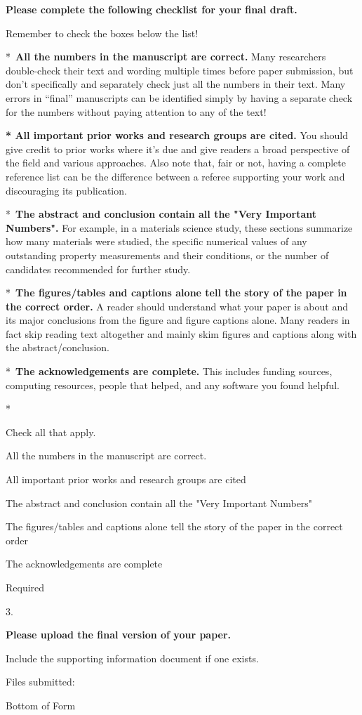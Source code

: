 \documentclass[]{article}
\begin{document}
\textbf{Please complete the following checklist for your final draft.}

Remember to check the boxes below the list!

*~\textbf{All the numbers in the manuscript are correct.} Many
researchers double-check their text and wording multiple times before
paper submission, but don't specifically and separately check just all
the numbers in their text. Many errors in ``final'' manuscripts can be
identified simply by having a separate check for the numbers without
paying attention to any of the text!

\textbf{* All important prior works and research groups are cited.} You
should give credit to prior works where it's due and give readers a
broad perspective of the field and various approaches. Also note that,
fair or not, having a complete reference list can be the difference
between a referee supporting your work and discouraging its publication.

*~\textbf{The abstract and conclusion contain all the "Very Important
Numbers".} For example, in a materials science study, these sections
summarize how many materials were studied, the specific numerical values
of any outstanding property measurements and their conditions, or the
number of candidates recommended for further study.

*~\textbf{The figures/tables and captions alone tell the story of the
paper in the correct order.} A reader should understand what your paper
is about and its major conclusions from the figure and figure captions
alone. Many readers in fact skip reading text altogether and mainly skim
figures and captions along with the abstract/conclusion.

*~\textbf{The acknowledgements are complete.} This includes funding
sources, computing resources, people that helped, and any software you
found helpful.

*

Check all that apply.

All the numbers in the manuscript are correct.

All important prior works and research groups are cited

The abstract and conclusion contain all the "Very Important Numbers"

The figures/tables and captions alone tell the story of the paper in the
correct order

The acknowledgements are complete

Required

3.

\textbf{Please upload the final version of your paper.}

Include the supporting information document if one exists.

Files submitted:

Bottom of Form
\end{document}
